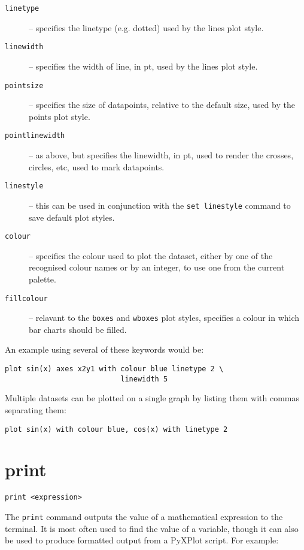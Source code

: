 \documentclass[a4paper,onecolumn,11pt]{book}
\begin{document}
\begin{description}
\item[{\tt linetype}] -- specifies the linetype (e.g. dotted) used by the lines plot style. 
\item[{\tt linewidth}] -- specifies the width of line, in pt, used by the lines plot style.
\item[{\tt pointsize}] -- specifies the size of datapoints, relative to the
default size, used by the points plot style. 
\item[{\tt pointlinewidth}] -- as above, but specifies the linewidth, in pt,
used to render the crosses, circles, etc, used to mark datapoints. 
\item[{\tt linestyle}] -- this can be used in conjunction with the {\tt set linestyle} command to save default plot styles. 
\item[{\tt colour}] -- specifies the colour used to plot the dataset, either by
one of the recognised colour names or by an integer,
to use one from the current palette.  \item[{\tt fillcolour}] -- relavant to the
{\tt boxes} and {\tt wboxes} plot
styles, specifies a colour in which bar charts should be filled.
\end{description}

An example using several of these keywords would be:

\begin{verbatim}
plot sin(x) axes x2y1 with colour blue linetype 2 \
                           linewidth 5
\end{verbatim}

Multiple datasets can be plotted on a single graph by listing them with commas
separating them:

\begin{verbatim}
plot sin(x) with colour blue, cos(x) with linetype 2
\end{verbatim}


\section{print}

\begin{verbatim}
print <expression>
\end{verbatim}

The {\tt print} command outputs the value of a mathematical expression to the
terminal.  It is most often used to find the value of a variable, though it can
also be used to produce formatted output from a PyXPlot script. For example:
\end{document}
